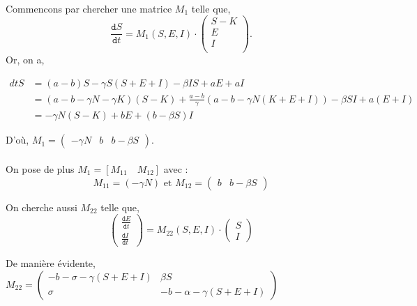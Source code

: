 \documentclass[11pt]{article}
\newcommand{\deriv}{\texttt{d}}
\newcommand{\dt}[1]{\frac{\deriv #1}{\deriv t}}
\begin{document}
\paragraph{}
Commencons par chercher une matrice $M_1$ telle que, 
\[
\dt S = M_1(S, E, I)  \cdot 
	\begin{pmatrix}
		S- K\\
		E \\
		I \\
	\end{pmatrix}.
\]
 Or, on a, 

 \begin{align*}
	 dt S &= (a-b)S - \gamma S (S+E+I) - \beta I S + a E + aI \\
	      &= (a - b- \gamma N - \gamma K)(S-K) + \frac{a-b}{\gamma} \left(a-b- \gamma N (K + E + I) \right) - \beta SI + a (E +I)\\
	      &= -\gamma N (S-K) + bE + (b- \beta S) I 
\end{align*}

D'o\`u, $M_1 = \begin{pmatrix} -\gamma N & b  & b - \beta S \end{pmatrix}$.

\paragraph{} On pose de plus $M_1 = [M_{11}\quad M_{12}]$ avec :
\[
M_{11} = (-\gamma N) \text{ et } M_{12} = \begin{pmatrix}b & b - \beta S \end{pmatrix}
\]

On cherche aussi $M_{22}$ telle que,
\[
\begin{pmatrix}\dt E \\ \dt I\end{pmatrix}= M_{22}(S,E,I) \cdot \begin{pmatrix}S\\I\end{pmatrix}
\]

De mani\`ere \'evidente, $M_{22} = \begin{pmatrix}-b -\sigma-\gamma(S+E+I) & \beta S\\ \sigma & -b-\alpha-\gamma(S+E+I)\end{pmatrix}$
\end{document}
